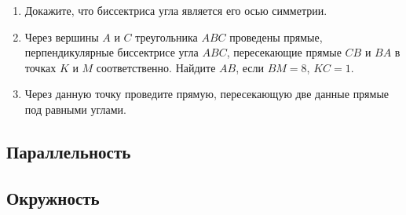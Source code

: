 \documentclass[10pt, a4paper]{article}
\begin{document}
\begin{enumerate}
		\item {} Докажите, что биссектриса угла является его осью симметрии.
		\item {} Через вершины $A$ и $C$ треугольника $ABC$ проведены прямые, перпендикулярные биссектрисе угла $ABC$, пересекающие прямые $CB$ и $BA$ в точках $K$ и $M$ соответственно. Найдите $AB$, если $BM = 8$, $KC = 1$.
		\item {} Через данную точку проведите прямую, пересекающую две данные прямые под равными углами.
	\end{enumerate}
\subsection{Параллельность}
\subsection{Окружность}
\end{document}

